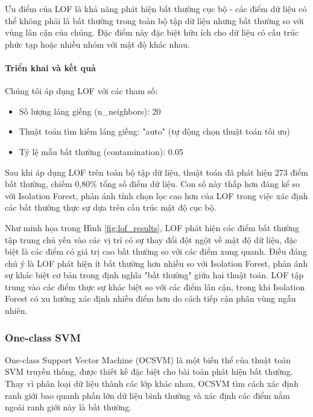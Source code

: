 Ưu điểm của LOF là khả năng phát hiện bất thường cục bộ - các điểm dữ liệu có thể không phải là bất thường trong toàn bộ tập dữ liệu nhưng bất thường so với vùng lân cận của chúng. Đặc điểm này đặc biệt hữu ích cho dữ liệu có cấu trúc phức tạp hoặc nhiều nhóm với mật độ khác nhau.

\paragraph{Triển khai và kết quả}
Chúng tôi áp dụng LOF với các tham số:
\begin{itemize}
    \item Số lượng láng giềng (n\_neighbors): 20
    \item Thuật toán tìm kiếm láng giềng: "auto" (tự động chọn thuật toán tối ưu)
    \item Tỷ lệ mẫu bất thường (contamination): 0.05
\end{itemize}

Sau khi áp dụng LOF trên toàn bộ tập dữ liệu, thuật toán đã phát hiện 273 điểm bất thường, chiếm 0,80\% tổng số điểm dữ liệu. Con số này thấp hơn đáng kể so với Isolation Forest, phản ánh tính chọn lọc cao hơn của LOF trong việc xác định các bất thường thực sự dựa trên cấu trúc mật độ cục bộ.


Như minh họa trong Hình \ref{fig:lof_results}, LOF phát hiện các điểm bất thường tập trung chủ yếu vào các vị trí có sự thay đổi đột ngột về mật độ dữ liệu, đặc biệt là các điểm có giá trị cao bất thường so với các điểm xung quanh. Điều đáng chú ý là LOF phát hiện ít bất thường hơn nhiều so với Isolation Forest, phản ánh sự khác biệt cơ bản trong định nghĩa "bất thường" giữa hai thuật toán. LOF tập trung vào các điểm thực sự khác biệt so với các điểm lân cận, trong khi Isolation Forest có xu hướng xác định nhiều điểm hơn do cách tiếp cận phân vùng ngẫu nhiên.

\subsubsection{One-class SVM}

One-class Support Vector Machine (OCSVM) là một biến thể của thuật toán SVM truyền thống, được thiết kế đặc biệt cho bài toán phát hiện bất thường. Thay vì phân loại dữ liệu thành các lớp khác nhau, OCSVM tìm cách xác định ranh giới bao quanh phần lớn dữ liệu bình thường và xác định các điểm nằm ngoài ranh giới này là bất thường.

